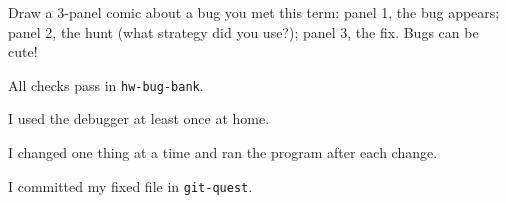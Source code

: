 \begin{creative}
Draw a 3-panel comic about a bug you met this term: panel 1, the bug appears; panel 2, the hunt (what strategy did you use?); panel 3, the fix. Bugs can be cute!
\answerspace{4cm}
\end{creative}

\begin{selfcheck}
  \item All checks pass in \texttt{hw-bug-bank}.
  \item I used the debugger at least once at home.
  \item I changed one thing at a time and ran the program after each change.
  \item I committed my fixed file in \texttt{git-quest}.
\end{selfcheck}
